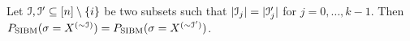 \documentclass{article}
\begin{document}
\begin{lemma} \label{lm:cc}
Let $\mathcal{I},\mathcal{I}'\subseteq[n]\setminus\{i\}$ be two subsets such that $|\mathcal{I}_j|=|\mathcal{I}_j'|$ for $j=0,\dots,k-1$. 
Then $P_{\operatorname{SIBM}}(\sigma=X^{(\sim\mathcal{I})}) = P_{\operatorname{SIBM}}(\sigma=X^{(\sim\mathcal{I}')})$.
\end{lemma}



\end{document}
